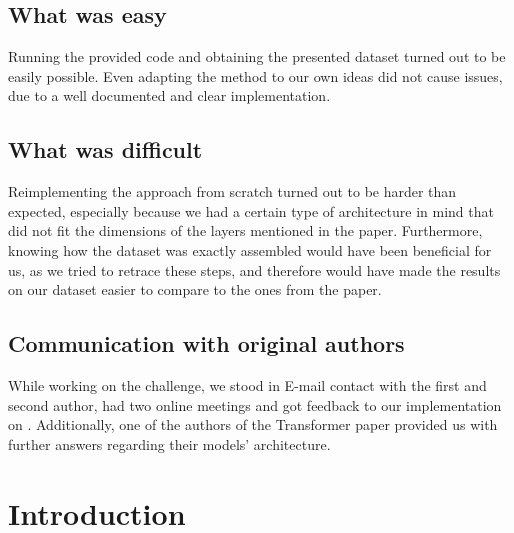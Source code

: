 \subsection*{What was easy}

Running the provided code and obtaining the presented dataset turned out to be easily possible.
Even adapting the method to our own ideas did not cause issues, due to a well documented and clear implementation.


\subsection*{What was difficult}

Reimplementing the approach from scratch turned out to be harder than expected, especially because we had a certain type of architecture in mind that did not fit the dimensions of the layers mentioned in the paper.
Furthermore, knowing how the dataset was exactly assembled would have been beneficial for us, as we tried to retrace these steps, and therefore would have made the results on our dataset easier to compare to the ones from the paper.


\subsection*{Communication with original authors}

While working on the challenge, we stood in E-mail contact with the first and second author, had two online meetings and got feedback to our implementation on \GitHub. 
Additionally, one of the authors of the Transformer paper \parencite{Vaswani17:Attention} provided us with further answers regarding their models' architecture.



\newpage


\section{Introduction}

